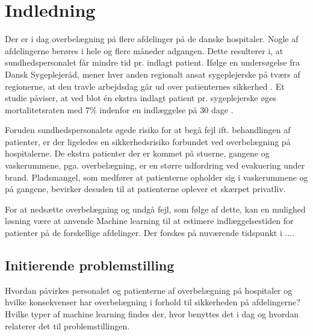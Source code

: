 \chapter{Indledning}
Der er i dag overbelægning på flere afdelinger på de danske hospitaler. Nogle af afdelingerne berøres i hele og flere måneder adgangen. \cite{2015} Dette resulterer i, at sundhedspersonalet får mindre tid pr. indlagt patient. Ifølge en undersøgelse fra Dansk Sygeplejeråd, mener hver anden regionalt ansat sygeplejerske på tværs af regionerne, at den travle arbejdsdag går ud over patienternes sikkerhed \cite{Kjeldsen2015}. Et studie påviser, at ved blot én ekstra indlagt patient pr. sygeplejerske øges mortalitetsraten med $7 \%$ indenfor en indlæggelse på 30 dage  \cite{Aiken2014}. 

Foruden sundhedspersonalets øgede risiko for at begå fejl ift. behandlingen af patienter, er der ligeledes en sikkerhedsrisiko forbundet ved overbelægning på hospitalerne. De ekstra patienter der er kommet på stuerne, gangene og vaskerummene, pga. overbelægning, er en større udfordring ved evakuering under brand. Pladsmangel, som medfører at patienterne opholder sig i vaskerummene og på gangene, bevirker desuden til at patienterne oplever et skærpet privatliv. \cite{Madsen2014}

For at nedsætte overbelægning og undgå fejl, som følge af dette, kan en mulighed løsning være at anvende Machine learning til at estimere indlæggelsestiden for patienter på de forskellige afdelinger. Der forskes på nuværende tidspunkt i ....



\section{Initierende problemstilling}
Hvordan påvirkes personalet og patienterne af overbelægning på hospitaler og hvilke konsekvenser har overbelægning i forhold til sikkerheden på afdelingerne?
Hvilke typer af machine learning findes der, hvor benyttes det i dag og hvordan relaterer det til problemstillingen.

